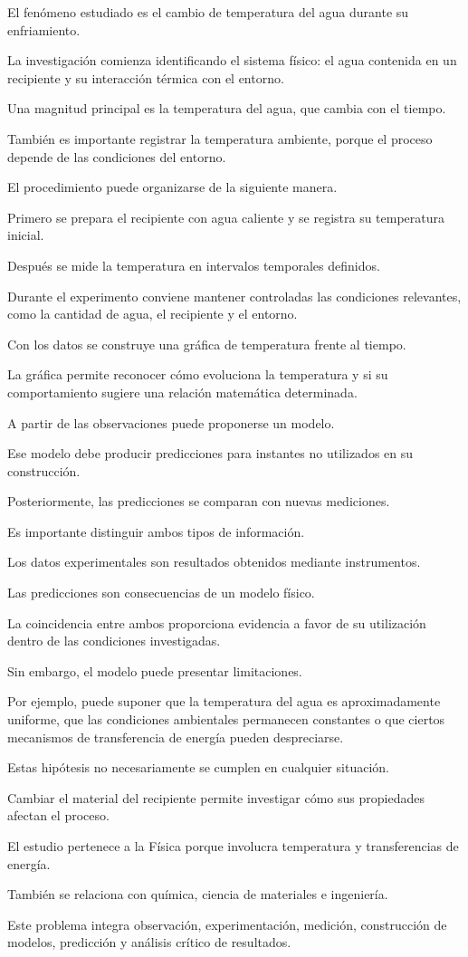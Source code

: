 \begin{explicacion}
El fenómeno estudiado es el cambio de temperatura del agua durante su enfriamiento.

La investigación comienza identificando el sistema físico: el agua contenida en un recipiente y su interacción térmica con el entorno.

Una magnitud principal es la temperatura del agua, que cambia con el tiempo.

También es importante registrar la temperatura ambiente, porque el proceso depende de las condiciones del entorno.

El procedimiento puede organizarse de la siguiente manera.

Primero se prepara el recipiente con agua caliente y se registra su temperatura inicial.

Después se mide la temperatura en intervalos temporales definidos.

Durante el experimento conviene mantener controladas las condiciones relevantes, como la cantidad de agua, el recipiente y el entorno.

Con los datos se construye una gráfica de temperatura frente al tiempo.

La gráfica permite reconocer cómo evoluciona la temperatura y si su comportamiento sugiere una relación matemática determinada.

A partir de las observaciones puede proponerse un modelo.

Ese modelo debe producir predicciones para instantes no utilizados en su construcción.

Posteriormente, las predicciones se comparan con nuevas mediciones.

Es importante distinguir ambos tipos de información.

Los datos experimentales son resultados obtenidos mediante instrumentos.

Las predicciones son consecuencias de un modelo físico.

La coincidencia entre ambos proporciona evidencia a favor de su utilización dentro de las condiciones investigadas.

Sin embargo, el modelo puede presentar limitaciones.

Por ejemplo, puede suponer que la temperatura del agua es aproximadamente uniforme, que las condiciones ambientales permanecen constantes o que ciertos mecanismos de transferencia de energía pueden despreciarse.

Estas hipótesis no necesariamente se cumplen en cualquier situación.

Cambiar el material del recipiente permite investigar cómo sus propiedades afectan el proceso.

El estudio pertenece a la Física porque involucra temperatura y transferencias de energía.

También se relaciona con química, ciencia de materiales e ingeniería.

Este problema integra observación, experimentación, medición, construcción de modelos, predicción y análisis crítico de resultados.
\end{explicacion}